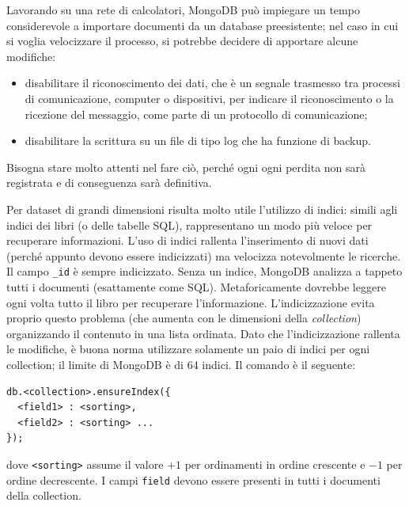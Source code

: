 \documentclass[a4page, 11pt]{article}
\begin{document}
Lavorando su una rete di calcolatori, MongoDB può impiegare un tempo considerevole a importare documenti da un database preesistente; nel caso in cui si voglia velocizzare il processo, si potrebbe decidere di apportare alcune modifiche:
\begin{itemize}[noitemsep]
\item disabilitare il riconoscimento dei dati, che è un segnale trasmesso tra processi di comunicazione, computer o dispositivi, per indicare il riconoscimento o la ricezione del messaggio, come parte di un protocollo di comunicazione;
\item disabilitare la scrittura su un file di tipo log che ha funzione di backup.
\end{itemize}
Bisogna stare molto attenti nel fare ciò, perché ogni ogni perdita non sarà registrata e di conseguenza sarà definitiva.
\newline

Per dataset di grandi dimensioni risulta molto utile l'utilizzo di indici: simili agli indici dei libri (o delle tabelle SQL), rappresentano un modo più veloce per recuperare informazioni.
L'uso di indici rallenta l'inserimento di nuovi dati (perché appunto devono essere indicizzati) ma velocizza notevolmente le ricerche.
Il campo \verb|_id| è sempre indicizzato.
Senza un indice, MongoDB analizza a tappeto tutti i documenti (esattamente come SQL).
Metaforicamente dovrebbe leggere ogni volta tutto il libro per recuperare l'informazione.
L'indicizzazione evita proprio questo problema (che aumenta con le dimensioni della \textit{collection}) organizzando il contenuto in una lista ordinata.
Dato che l'indicizzazione rallenta le modifiche, è buona norma utilizzare solamente un paio di indici per ogni collection; il limite di MongoDB è di 64 indici.
Il comando è il seguente:
\begin{verbatim}
db.<collection>.ensureIndex({
  <field1> : <sorting>,
  <field2> : <sorting> ...
});
\end{verbatim}
dove \verb|<sorting>| assume il valore $+1$ per ordinamenti in ordine crescente e $-1$ per ordine decrescente.
I campi \verb|field| devono essere presenti in tutti i documenti della collection.
\end{document}
